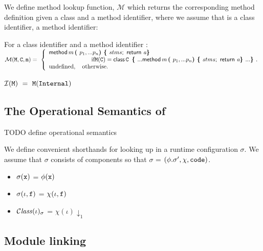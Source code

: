 We define  method lookup function, $\mathcal{M}$ which returns the corresponding method definition given a class and a method identifier, where we assume that  is a class identifier,    a method identifier: $ ~ $ \\

  
 \begin{definition}[Lookup]For a class identifier   and a method identifier  : $ ~ $ \\

\noindent
$
{\mathcal M}({\mbox{\tt{M}}}{},{\mbox{\tt{{\mbox{\tt{C}}}}}}, {\mbox{\tt{m}}})      =  \ \left\{  
\begin{array}{l}
                          {\bf{\sf {method}}}\, m\, \mbox{\tt{\bf{( }}} p_1, ... p_n \mbox{\tt{\bf{) }}} \mbox{\tt{\bf{\{ }}} stms \mbox{{{\bf{\sf {;}}}}\ }\, {\bf{\sf {return}}}\ {{\mbox{\tt{{\it a}}}}} \mbox{\tt{\bf{\} }}}\\
\hspace{1in} \mbox{if}  {\mbox{\tt{M}}}({\mbox{\tt{C}}}) =   
{\bf{\sf {class}}}\, {\mbox{\tt{C}}}\, \  \mbox{\tt{\bf{\{ }}} ...   {\bf{\sf {method}}}\, m\, \mbox{\tt{\bf{( }}} p_1, ... p_n \mbox{\tt{\bf{) }}} \mbox{\tt{\bf{\{ }}} stms \mbox{{{\bf{\sf {;}}}}\ }\, {\bf{\sf {return}}}\ {{\mbox{\tt{{\it a}}}}} \mbox{\tt{\bf{\} }}}  ... \mbox{\tt{\bf{\} }}}.  
\\
\mbox{undefined},  \ \ \ \mbox{otherwise.}
\end{array}
                    \right.$
 
${\mathcal{ I}} ( {{\mbox{\tt{M}}}} ) \    =  \     {\mbox{\tt{M}}}({\mbox{\tt{Internal}}} )$
  \end{definition}

\subsection{The Operational Semantics of \LangOO}
\label{formal:semantics}

TODO define operational semantics

\begin{definition}
We define convenient shorthands for looking up in a runtime configuration $\sigma$. We assume that
$\sigma$ consists of components so that $\sigma$ = $(\phi.\sigma', \chi, {\mbox{\tt{code}}} )$.
\begin{itemize}
\item 
$\sigma({\mbox{\tt{x}}})$ = $\phi({\mbox{\tt{x}}})$ 
\item
$\sigma(\iota, {\mbox{\tt{f}}})$ = $\chi(\iota,{\mbox{\tt{f}}})$ 
\item
${\mathcal C}{\mathit{lass}}(\iota)_{\sigma} $ = $\chi(\iota)\downarrow_1$
\end{itemize}

\end{definition}

\subsection{Module linking}

